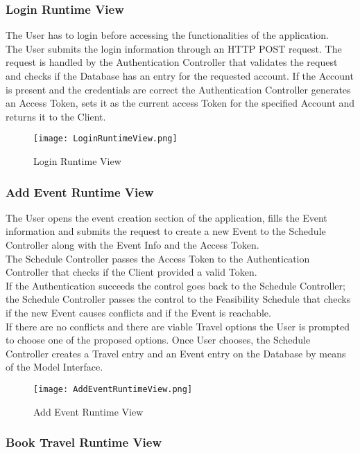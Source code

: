 \subsubsection{Login Runtime View}

The User has to login before accessing the functionalities of the application.\\
The User submits the login information through an HTTP POST request.
The request is handled by the Authentication Controller that validates the request and checks if the Database has an entry for the requested account.
If the Account is present and the credentials are correct the Authentication Controller generates an Access Token, sets it as the current access Token for the specified Account and returns it to the Client.

 
\begin{figure}[H]
	\centering
	\texttt{[image: LoginRuntimeView.png]}
	\caption{Login Runtime View}
\end{figure}

\subsubsection{Add Event Runtime View}

The User opens the event creation section of the application, fills the Event information and submits the request to create a new Event to the Schedule Controller along with the Event Info and the Access Token.\\
The Schedule Controller passes the Access Token to the Authentication Controller that checks if the Client provided a valid Token.\\
If the Authentication succeeds the control goes back to the Schedule Controller; the Schedule Controller passes the control to the Feasibility Schedule that checks if the new Event causes conflicts and if the Event is reachable.\\
If there are no conflicts and there are viable Travel options the User is prompted to choose one of the proposed options.
Once User chooses, the Schedule Controller creates a Travel entry and an Event entry on the Database by means of the Model Interface.


\begin{figure}[H]
	\centering
	\texttt{[image: AddEventRuntimeView.png]}
	\caption{Add Event Runtime View}
\end{figure}

\subsubsection{Book Travel Runtime View}

